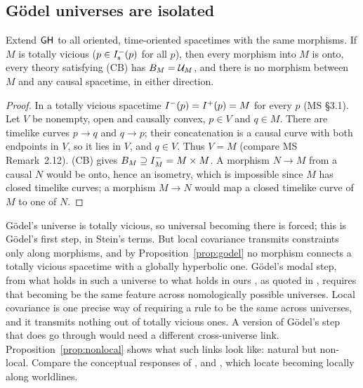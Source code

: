 \subsection{Gödel universes are isolated}\label{sec:godel}

\begin{proposition}\label{prop:godel}
Extend $\mathsf{GH}$ to all oriented, time-oriented spacetimes with the same
morphisms. If $M$ is totally vicious ($p\in I^{-}_{\mathrm s}(p)$ for all $p$),
then every morphism into $M$ is onto, every theory satisfying (CB) has
$B_M=\mathcal U_M$, and there is no morphism between $M$ and any causal spacetime, in
either direction.
\end{proposition}

\begin{proof}
In a totally vicious spacetime $I^{-}(p)=I^{+}(p)=M$ for every $p$ (MS \S3.1).
Let $V$ be nonempty, open and causally convex, $p\in V$ and $q\in M$. There are
timelike curves $p\to q$ and $q\to p$; their concatenation is a causal curve
with both endpoints in $V$, so it lies in $V$, and $q\in V$. Thus $V=M$
(compare MS Remark~2.12). (CB) gives $B_M\supseteq I^{-}_M=M\times M$. A morphism
$N\to M$ from a causal $N$ would be onto, hence an isometry, which is
impossible since $M$ has closed timelike curves; a morphism $M\to N$ would map
a closed timelike curve of $M$ to one of $N$.
\end{proof}

Gödel's universe is totally vicious, so universal becoming there is forced;
this is Gödel's first step, in Stein's terms. But local covariance transmits
constraints only along morphisms, and by Proposition~\ref{prop:godel} no
morphism connects a totally vicious spacetime with a globally hyperbolic one. Gödel's modal step, from what holds
in such a universe to what holds in ours \citep[pp.~561--562]{Godel1949}, as
quoted in \citep[\S6]{Monton2006}, requires that becoming be the same
feature across nomologically possible universes. Local covariance is one
precise way of requiring a rule to be the same across universes, and it
transmits nothing out of totally vicious ones. A version of Gödel's step that does go through
would need a different cross-universe link. Proposition~\ref{prop:nonlocal} shows what such links
look like: natural but non-local. Compare the conceptual responses of
\citet{Savitt2005}, \citet{Dieks2006} and \citet{Aames2022}, which locate
becoming locally along worldlines.
